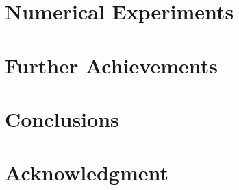 \documentclass[10pt,conference]{IEEEtran}
\begin{document}
\section{Numerical Experiments}
\label{sec:experiment}

\section{Further Achievements}
\label{sec:futureworks}

\section{Conclusions}
\label{sec:conclusion}

\section*{Acknowledgment}


%

\end{document}
